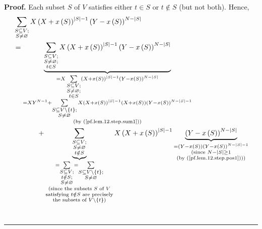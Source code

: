 \documentclass[numbers=enddot,12pt,final,onecolumn,notitlepage]{scrartcl}%
\theoremstyle{definition}
\newenvironment{proof}[1][Proof]{\noindent\textbf{#1.} }{\ \rule{0.5em}{0.5em}}
\let\sumnonlimits\sum
\renewcommand{\sum}{\sumnonlimits\limits}
\newenvironment{verlong}{}{}
\begin{document}
\begin{verlong}
\begin{proof}
Each subset $S$ of $V$ satisfies either $t\in S$ or $t\notin S$ (but not
both). Hence,
\begin{align*}
&  \sum_{\substack{S\subseteq V;\\S\neq\varnothing}}X\left(  X+x\left(
S\right)  \right)  ^{\left\vert S\right\vert -1}\left(  Y-x\left(  S\right)
\right)  ^{N-\left\vert S\right\vert }\\
&  =\underbrace{\sum_{\substack{S\subseteq V;\\S\neq\varnothing;\\t\in
S}}X\left(  X+x\left(  S\right)  \right)  ^{\left\vert S\right\vert -1}\left(
Y-x\left(  S\right)  \right)  ^{N-\left\vert S\right\vert }}_{\substack{=X\sum
_{\substack{S\subseteq V;\\S\neq\varnothing;\\t\in S}}\left(  X+x\left(
S\right)  \right)  ^{\left\vert S\right\vert -1}\left(  Y-x\left(  S\right)
\right)  ^{N-\left\vert S\right\vert }\\=XY^{N-1}+\sum_{\substack{S\subseteq
V\setminus\left\{  t\right\}  ;\\S\neq\varnothing}}X\left(  X+x\left(
S\right)  \right)  ^{\left\vert S\right\vert -1}\left(  X+x\left(  S\right)
\right)  \left(  Y-x\left(  S\right)  \right)  ^{N-\left\vert S\right\vert
-1}\\\text{(by (\ref{pf.lem.12.step.sum1}))}}}\\
&  \ \ \ \ \ \ \ \ \ \ +\underbrace{\sum_{\substack{S\subseteq V;\\S\neq
\varnothing\\t\notin S}}}_{\substack{=\sum_{\substack{S\subseteq V;\\t\notin
S;\\S\neq\varnothing}}=\sum_{\substack{S\subseteq V\setminus\left\{
t\right\}  ;\\S\neq\varnothing}}\\\text{(since the subsets }S\text{ of
}V\\\text{satisfying }t\notin S\text{ are precisely}\\\text{the subsets of
}V\setminus\left\{  t\right\}  \text{)}}}X\left(  X+x\left(  S\right)
\right)  ^{\left\vert S\right\vert -1}\underbrace{\left(  Y-x\left(  S\right)
\right)  ^{N-\left\vert S\right\vert }}_{\substack{=\left(  Y-x\left(
S\right)  \right)  \left(  Y-x\left(  S\right)  \right)  ^{N-\left\vert
S\right\vert -1}\\\text{(since }N-\left\vert S\right\vert \geq1\\\text{(by
(\ref{pf.lem.12.step.pos1})))}}}\\

\end{align*}
\end{proof}
\end{verlong}
\end{document}
